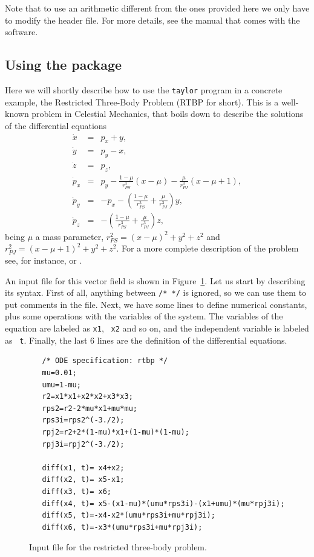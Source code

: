 \documentclass[12pt,twoside]{article}
\begin{document}
Note that to use an arithmetic different from the ones provided here
we only have to modify the header file. For more details, see the
manual that comes with the software.

\subsection{Using the package}\label{sec:using}
Here we will shortly describe how to use the \texttt{taylor} program
in a concrete example, the Restricted Three-Body Problem (RTBP for
short). This is a well-known problem in Celestial Mechanics, that
boils down to describe the solutions of the differential equations
\begin{equation}
\begin{array}{rcl}
\dot{x} & = & p_x+y,\\
\dot{y} & = & p_y-x,\\
\dot{z} & = & p_z,\\
\dot{p}_x & = & p_y-\frac{1-\mu}{r_{PS}^3}(x-\mu)
                -\frac{\mu}{r_{PJ}^3}(x-\mu+1),\\
\dot{p}_y & = & -p_x
                -\left(\frac{1-\mu}{r_{PS}^3}+\frac{\mu}{r_{PJ}^3}\right)y,\\
\dot{p}_z & = & -\left(\frac{1-\mu}{r_{PS}^3}+\frac{\mu}{r_{PJ}^3}\right)z,
\end{array}
\label{eq:rtbp}
\end{equation}
being $\mu$ a mass parameter, $r_{PS}^2=(x-\mu)^2+y^2+z^2$ and
$r_{PJ}^2=(x-\mu+1)^2+y^2+z^2$.  For a more complete description of
the problem see, for instance, \cite{Szebehely67} or \cite{MeyerH92}.

An input file for this vector field is shown in
Figure~\ref{fig:i-rtbp}. Let us start by describing its syntax. First
of all, anything between \verb-/* */- is ignored, so we can use them
to put comments in the file. Next, we have some lines to define
numerical constants, plus some operations with the variables of the
system. The variables of the equation are labeled as {\tt x1}, {\tt
x2} and so on, and the independent variable is labeled as {\tt
t}. Finally, the last 6 lines are the definition of the differential
equations.

\begin{figure}
\begin{verbatim}
   /* ODE specification: rtbp */
   mu=0.01;
   umu=1-mu;
   r2=x1*x1+x2*x2+x3*x3;
   rps2=r2-2*mu*x1+mu*mu;
   rps3i=rps2^(-3./2);
   rpj2=r2+2*(1-mu)*x1+(1-mu)*(1-mu);
   rpj3i=rpj2^(-3./2);

   diff(x1, t)= x4+x2;
   diff(x2, t)= x5-x1;
   diff(x3, t)= x6;
   diff(x4, t)= x5-(x1-mu)*(umu*rps3i)-(x1+umu)*(mu*rpj3i);
   diff(x5, t)=-x4-x2*(umu*rps3i+mu*rpj3i);
   diff(x6, t)=-x3*(umu*rps3i+mu*rpj3i);
\end{verbatim}
\caption{Input file for the restricted three-body problem.}
\label{fig:i-rtbp}
\end{figure}
\end{document}
